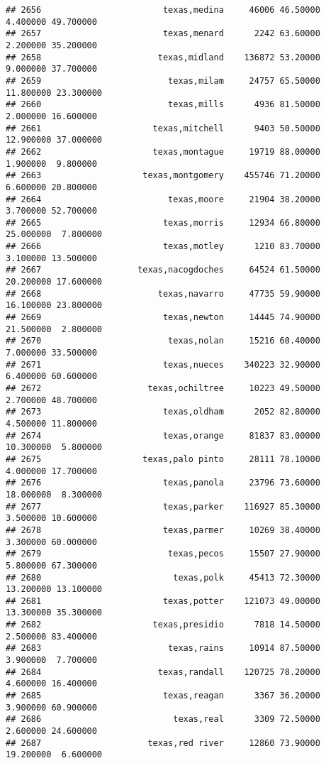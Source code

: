 \documentclass[
]{article}
\begin{document}
\begin{verbatim}
## 2656                        texas,medina     46006 46.50000  4.400000 49.700000
## 2657                        texas,menard      2242 63.60000  2.200000 35.200000
## 2658                       texas,midland    136872 53.20000  9.000000 37.700000
## 2659                         texas,milam     24757 65.50000 11.800000 23.300000
## 2660                         texas,mills      4936 81.50000  2.000000 16.600000
## 2661                      texas,mitchell      9403 50.50000 12.900000 37.000000
## 2662                      texas,montague     19719 88.00000  1.900000  9.800000
## 2663                    texas,montgomery    455746 71.20000  6.600000 20.800000
## 2664                         texas,moore     21904 38.20000  3.700000 52.700000
## 2665                        texas,morris     12934 66.80000 25.000000  7.800000
## 2666                        texas,motley      1210 83.70000  3.100000 13.500000
## 2667                   texas,nacogdoches     64524 61.50000 20.200000 17.600000
## 2668                       texas,navarro     47735 59.90000 16.100000 23.800000
## 2669                        texas,newton     14445 74.90000 21.500000  2.800000
## 2670                         texas,nolan     15216 60.40000  7.000000 33.500000
## 2671                        texas,nueces    340223 32.90000  6.400000 60.600000
## 2672                     texas,ochiltree     10223 49.50000  2.700000 48.700000
## 2673                        texas,oldham      2052 82.80000  4.500000 11.800000
## 2674                        texas,orange     81837 83.00000 10.300000  5.800000
## 2675                    texas,palo pinto     28111 78.10000  4.000000 17.700000
## 2676                        texas,panola     23796 73.60000 18.000000  8.300000
## 2677                        texas,parker    116927 85.30000  3.500000 10.600000
## 2678                        texas,parmer     10269 38.40000  3.300000 60.000000
## 2679                         texas,pecos     15507 27.90000  5.800000 67.300000
## 2680                          texas,polk     45413 72.30000 13.200000 13.100000
## 2681                        texas,potter    121073 49.00000 13.300000 35.300000
## 2682                      texas,presidio      7818 14.50000  2.500000 83.400000
## 2683                         texas,rains     10914 87.50000  3.900000  7.700000
## 2684                       texas,randall    120725 78.20000  4.600000 16.400000
## 2685                        texas,reagan      3367 36.20000  3.900000 60.900000
## 2686                          texas,real      3309 72.50000  2.600000 24.600000
## 2687                     texas,red river     12860 73.90000 19.200000  6.600000

\end{verbatim}
\end{document}
